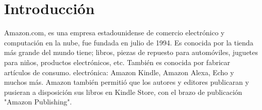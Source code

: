 %
%

\section{Introducción}

Amazon.com,  es una empresa estadounidense de comercio electrónico y computación en la nube, fue fundada en julio de 1994. Es conocida por la tienda más grande del mundo tiene; libros, piezas de repuesto para automóviles, juguetes para niños, productos electrónicos, etc. También es conocida por fabricar artículos de consumo. electrónica: Amazon Kindle, Amazon Alexa, Echo y muchos más. Amazon también permitió que los autores y editores publicaran y pusieran a disposición sus libros en Kindle Store, con el brazo de publicación "Amazon Publishing". 

\clearpage
 